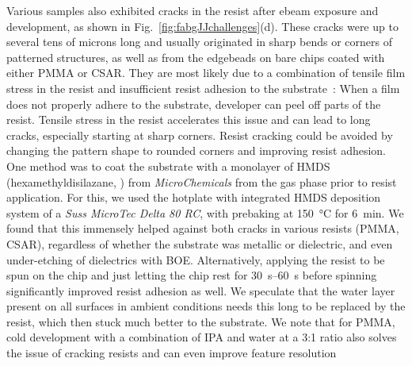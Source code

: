 Various samples also exhibited cracks in the resist after ebeam exposure and development, as shown in Fig.~\ref{fig:fabgJJchallenges}(d).
%
These cracks were up to several tens of microns long and usually originated in sharp bends or corners of patterned structures, as well as from the edgebeads on bare chips coated with either PMMA or CSAR.
%
They are most likely due to a combination of tensile film stress in the resist and insufficient resist adhesion to the substrate~\cite{jacksonMicrofabricationNanomanufacturing2006}:
%
When a film does not properly adhere to the substrate, developer can peel off parts of the resist.
%
Tensile stress in the resist accelerates this issue and can lead to long cracks, especially starting at sharp corners.
%
Resist cracking could be avoided by changing the pattern shape to rounded corners and improving resist adhesion.
%
One method was to coat the substrate with a monolayer of HMDS (hexamethyldisilazane, ) from \textit{MicroChemicals} from the gas phase prior to resist application.
%
For this, we used the hotplate with integrated HMDS deposition system of a \textit{Suss MicroTec Delta 80 RC}, with prebaking at \SI{150}{\celsius} for \SI{6}{\minute}.
% 
We found that this immensely helped against both cracks in various resists (PMMA, CSAR), regardless of whether the substrate was metallic or dielectric, and even under-etching of dielectrics with BOE.
%
Alternatively, applying the resist to be spun on the chip and just letting the chip rest for \SIrange{30}{60}{\second} before spinning significantly improved resist adhesion as well.
%
We speculate that the water layer present on all surfaces in ambient conditions needs this long to be replaced by the resist, which then stuck much better to the substrate.
%
We note that for PMMA, cold development with a combination of IPA and water at a 3:1 ratio also solves the issue of cracking resists and can even improve feature resolution~\cite{rooksLowStressDevelopment2002,cordOptimalTemperatureDevelopment2007}

